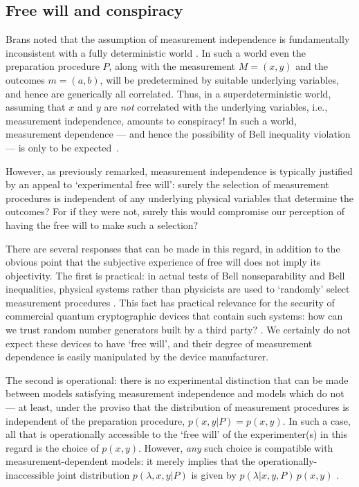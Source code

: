 \documentclass[graybox]{svmult}
\begin{document}

\subsection{Free will and conspiracy}
\label{5.2}

Brans noted that the assumption of measurement independence is fundamentally inconsistent with a fully deterministic world \cite{brans}.  In such a world even the preparation procedure $P$, along with the measurement $M=(x,y)$ and the outcomes $m=(a,b)$, will be predetermined by suitable underlying variables, and hence are  generically all correlated.  Thus, in a superdeterministic world, assuming that $x$ and $y$ are {\it not} correlated with the underlying variables, i.e., measurement independence, amounts to conspiracy!  In such a world, measurement dependence --- and hence the possibility of Bell inequality violation --- is only to be expected~\cite{thooft}.

However, as previously remarked, measurement independence is typically justified by an appeal to `experimental free will': surely the selection of measurement procedures is  independent of any underlying physical variables that determine the outcomes?  For if they were not, surely this would compromise our perception of having the free will to make such a selection?

There are several responses that can be made in this regard, in addition to the obvious point that the subjective experience of free will does not imply its objectivity.  The first is practical: in actual tests of Bell nonseparability and Bell inequalities, physical systems rather than physicists are used to `randomly' select measurement procedures \cite{aspect, hansen}. This fact has practical relevance for the security of commercial quantum cryptographic devices that contain such systems: how can we trust random number generators built by a third party? \cite{koh,scarani,kay}.  We certainly do not expect these devices to have `free will', and their degree of measurement dependence is easily manipulated by the device manufacturer.

The second is operational: there is no experimental distinction that can be made between models satisfying measurement independence and models which do not \cite{brans} --- at least, under the proviso that the distribution of measurement procedures is independent of the preparation procedure, $p(x,y|P)=p(x,y)$.  In such a case, all that is operationally accessible to the `free will' of the experimenter(s) in this regard is the choice of $p(x,y)$.  However, {\it any} such choice is compatible with measurement-dependent models: it merely implies that the operationally-inaccessible joint distribution $p(\lambda, x,y|P)$ is given by $p(\lambda|x,y,P)\,p(x,y)$ \cite{relaxed}.
\end{document}
